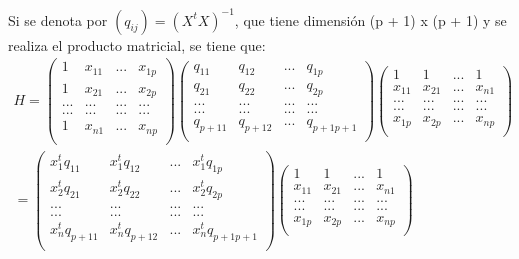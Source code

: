 \documentclass[12pt,spanish]{article}
\begin{document}
	
	
	
					
	
	Si se denota por $(q_{ij}) = (X^tX)^{-1}$, que tiene dimensión (p + 1) x (p + 1) y se realiza el producto matricial, se tiene que:\\
	
	\begin{equation}
		\begin{aligned}
	H = %
\begin{pmatrix}
1 & x_{11} & . . .& x_{1p} \\
1 & x_{21} & . . .& x_{2p}\\
... & ...& ...   & ...\\
... & ...&  ...  &  ...\\
1 & x_{n1} & . . .& x_{np}\\
\end{pmatrix}
% 
\begin{pmatrix}
 q_{11} &  q_{12}&. . .& q_{1p} \\
 q_{21} &  q_{22}&. . .& q_{2p} \\
... & ...& ...   & ...\\
... & ...&  ...  &  ...\\
 q_{p+11} &  q_{p+12}&. . .& q_{p+1p+1} \\
\end{pmatrix}
%
\begin{pmatrix}
1 & 1  & . . .& 1 \\
x_{11} & x_{21} & . . .& x_{n1}\\
... & ...& ...   & ...\\
... & ...&  ...  &  ...\\
 x_{1p} & x_{2p} & . . .& x_{np}\\
\end{pmatrix}
\\
	 = %
\begin{pmatrix}
 x^t_1 q_{11} &  x^t_1 q_{12}&. . .& x^t_1 q_{1p} \\
x^t_2 q_{21} & x^t_2 q_{22}&. . .& x^t_2 q_{2p} \\
... & ...& ...   & ...\\
... & ...&  ...  &  ...\\
x^t_n q_{p+11} & x^t_n q_{p+12}&. . .& x^t_n q_{p+1p+1} \\
\end{pmatrix}
%
\begin{pmatrix}
1 & 1  & . . .& 1 \\
x_{11} & x_{21} & . . .& x_{n1}\\
... & ...& ...   & ...\\
... & ...&  ...  &  ...\\
 x_{1p} & x_{2p} & . . .& x_{np}\\
\end{pmatrix}
 	\end{aligned}
	\end{equation}
	
\end{document}
